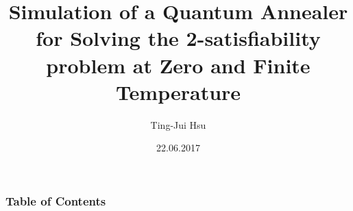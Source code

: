 \documentclass{beamer}
\title{Simulation of a Quantum Annealer for Solving the 2-satisfiability problem at Zero and Finite Temperature}
\author{Ting-Jui Hsu}
\institute{Quantum Information Group}
\date{22.06.2017}
\begin{document}
\frame{\titlepage}

%


\begin{frame}
	\frametitle{Table of Contents}
	\tableofcontents
\end{frame}


\end{document}
